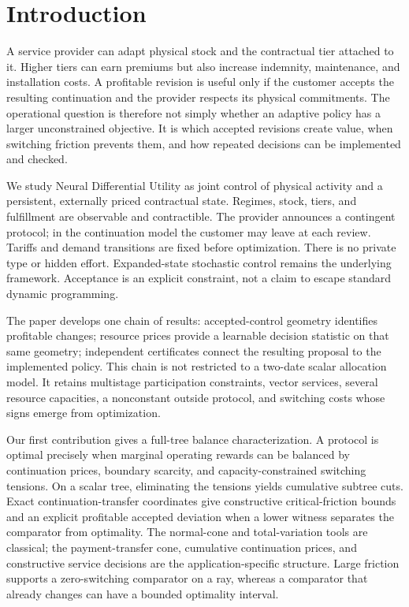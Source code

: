 \documentclass[11pt,letterpaper]{article}
\theoremstyle{definition}
\newcommand{\1}{\mathbf 1}
\begin{document}
\section{Introduction}
A service provider can adapt physical stock and the contractual tier attached to it. Higher tiers can earn premiums but also increase indemnity, maintenance, and installation costs. A profitable revision is useful only if the customer accepts the resulting continuation and the provider respects its physical commitments. The operational question is therefore not simply whether an adaptive policy has a larger unconstrained objective. It is which accepted revisions create value, when switching friction prevents them, and how repeated decisions can be implemented and checked.

We study Neural Differential Utility as joint control of physical activity and a persistent, externally priced contractual state. Regimes, stock, tiers, and fulfillment are observable and contractible. The provider announces a contingent protocol; in the continuation model the customer may leave at each review. Tariffs and demand transitions are fixed before optimization. There is no private type or hidden effort. Expanded-state stochastic control remains the underlying framework. Acceptance is an explicit constraint, not a claim to escape standard dynamic programming.

The paper develops one chain of results: accepted-control geometry identifies profitable changes; resource prices provide a learnable decision statistic on that same geometry; independent certificates connect the resulting proposal to the implemented policy. This chain is not restricted to a two-date scalar allocation model. It retains multistage participation constraints, vector services, several resource capacities, a nonconstant outside protocol, and switching costs whose signs emerge from optimization.

Our first contribution gives a full-tree balance characterization. A protocol is optimal precisely when marginal operating rewards can be balanced by continuation prices, boundary scarcity, and capacity-constrained switching tensions. On a scalar tree, eliminating the tensions yields cumulative subtree cuts. Exact continuation-transfer coordinates give constructive critical-friction bounds and an explicit profitable accepted deviation when a lower witness separates the comparator from optimality. The normal-cone and total-variation tools are classical; the payment-transfer cone, cumulative continuation prices, and constructive service decisions are the application-specific structure. Large friction supports a zero-switching comparator on a ray, whereas a comparator that already changes can have a bounded optimality interval.
\end{document}
